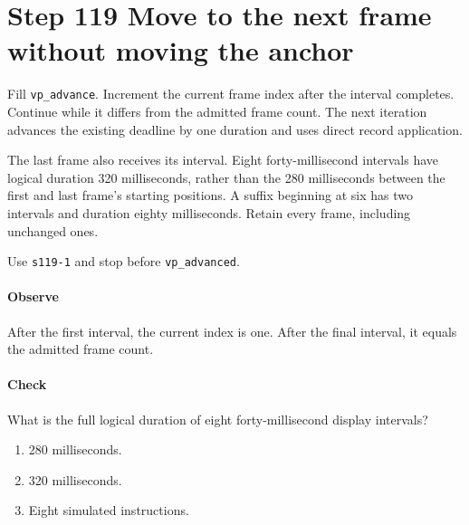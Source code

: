 \section{Step 119 Move to the next frame without moving the anchor}
Fill \texttt{vp\_advance}. Increment the current frame index after the interval completes. Continue while it differs from the admitted frame count. The next iteration advances the existing deadline by one duration and uses direct record application.

The last frame also receives its interval. Eight forty-millisecond intervals have logical duration 320 milliseconds, rather than the 280 milliseconds between the first and last frame's starting positions. A suffix beginning at six has two intervals and duration eighty milliseconds. Retain every frame, including unchanged ones.

Use \texttt{s119-1} and stop before \texttt{vp\_advanced}.

\paragraph{Observe} After the first interval, the current index is one. After the final interval, it equals the admitted frame count.

\paragraph{Check} What is the full logical duration of eight forty-millisecond display intervals?
\begin{enumerate}[label=\Alph*.]
  \item 280 milliseconds.
  \item 320 milliseconds.
  \item Eight simulated instructions.
\end{enumerate}
